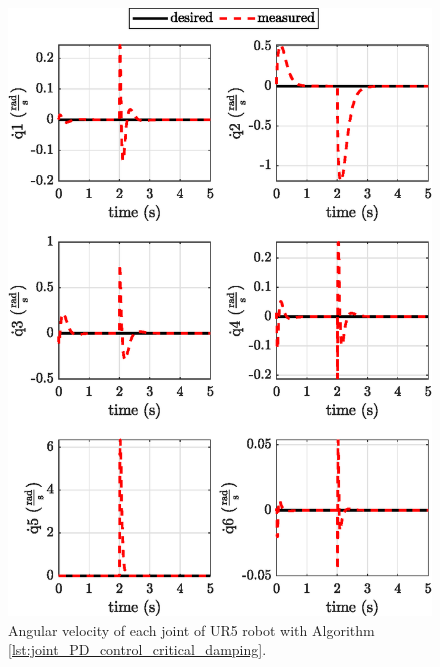 \begin{figure}[H]
    \centering
    \includegraphics{images/act_1.5_step/joint_velocity.eps}
    \caption{Angular velocity of each joint of UR5 robot with Algorithm \ref{lst:joint_PD_control_critical_damping}.}
    \label{fig:act_1.5_joint_velocity}
\end{figure}

